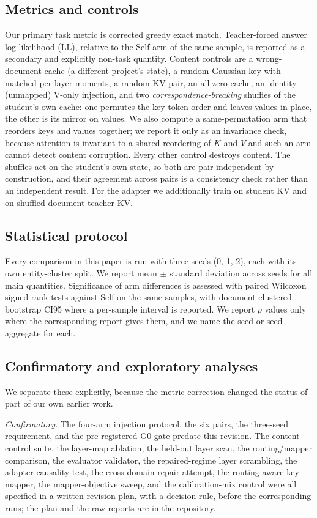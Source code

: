 \documentclass[11pt]{article}
\begin{document}
\subsection{Metrics and controls}
\label{sec:metrics}
Our primary task metric is corrected greedy exact match. Teacher-forced answer
log-likelihood (LL), relative to the Self arm of the same sample, is reported as
a secondary and explicitly non-task quantity. Content controls are a
wrong-document cache (a different project's state), a random Gaussian key with
matched per-layer moments, a random KV pair, an all-zero cache, an identity
(unmapped) V-only injection, and two \emph{correspondence-breaking} shuffles of
the student's own cache: one permutes the key token order and leaves values in
place, the other is its mirror on values. We also compute a same-permutation arm
that reorders keys and values together; we report it only as an invariance check,
because attention is invariant to a shared reordering of $K$ and $V$ and such an
arm cannot detect content corruption. Every other control destroys content. The
shuffles act on the student's own state, so both are pair-independent by
construction, and their agreement across pairs is a consistency check rather than
an independent result. For the adapter we additionally train on student KV and on
shuffled-document teacher KV.

\subsection{Statistical protocol}
\label{sec:stats-protocol}
Every comparison in this paper is run with three seeds (0, 1, 2), each with its
own entity-cluster split. We report mean $\pm$ standard deviation across seeds
for all main quantities. Significance of arm differences is assessed with paired
Wilcoxon signed-rank tests against Self on the same samples, with
document-clustered bootstrap CI95 where a per-sample interval is reported. We
report $p$ values only where the corresponding report gives them, and we name the
seed or seed aggregate for each.

\subsection{Confirmatory and exploratory analyses}
\label{sec:analyses}
We separate these explicitly, because the metric correction changed the status of
part of our own earlier work.

\emph{Confirmatory.} The four-arm injection protocol, the six pairs, the
three-seed requirement, and the pre-registered G0 gate predate this revision. The
content-control suite, the layer-map ablation, the held-out layer scan, the
routing/mapper comparison, the evaluator validator, the repaired-regime layer
scrambling, the adapter causality test, the cross-domain repair attempt, the
routing-aware key mapper, the mapper-objective sweep, and the calibration-mix
control were all specified in a written revision plan, with a decision rule,
before the corresponding runs; the plan and the raw reports are in the repository.
\end{document}

